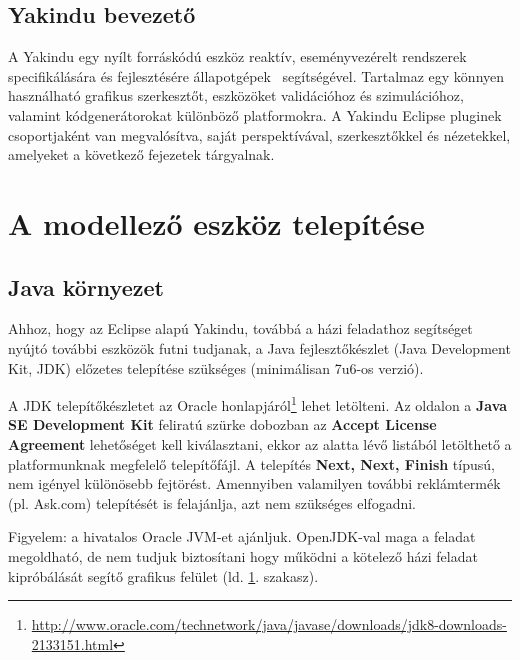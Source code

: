 \subsection{Yakindu bevezető}

A Yakindu egy nyílt forráskódú eszköz reaktív, eseményvezérelt rendszerek specifikálására és fejlesztésére állapotgépek~\cite{DBLP:journals/scp/Harel87} segítségével. Tartalmaz egy könnyen használható grafikus szerkesztőt, eszközöket validációhoz és szimulációhoz, valamint kódgenerátorokat különböző platformokra. A Yakindu Eclipse pluginek csoportjaként van megvalósítva, saját perspektívával, szerkesztőkkel és nézetekkel, amelyeket a következő fejezetek tárgyalnak.

\section{A modellező eszköz telepítése}
\label{sec:modellezo-eszkoz-telepitese}

\subsection{Java környezet}
Ahhoz, hogy az Eclipse alapú Yakindu, továbbá a házi feladathoz segítséget nyújtó további eszközök futni tudjanak, a Java fejlesztőkészlet (Java Development Kit, JDK) előzetes telepítése szükséges (minimálisan 7u6-os verzió).

A JDK telepítőkészletet az Oracle honlapjáról\footnote{\url{http://www.oracle.com/technetwork/java/javase/downloads/jdk8-downloads-2133151.html}} lehet letölteni. Az oldalon a \textbf{Java SE Development Kit} feliratú szürke dobozban az \textbf{Accept License Agreement} lehetőséget kell kiválasztani, ekkor az alatta lévő listából letölthető a platformunknak megfelelő telepítőfájl. A telepítés \textbf{Next, Next, Finish} típusú, nem igényel különösebb fejtörést. Amennyiben valamilyen további reklámtermék (pl. Ask.com) telepítését is felajánlja, azt nem szükséges elfogadni.

\begin{megjegyzes}
Figyelem: a hivatalos Oracle JVM-et ajánljuk. OpenJDK-val maga a feladat megoldható, de nem tudjuk biztosítani hogy működni a kötelező házi feladat kipróbálását segítő grafikus felület (ld. \ref{sec:modellezo-eszkoz-telepitese}. szakasz).
\end{megjegyzes}

